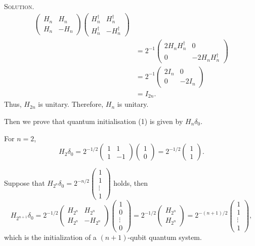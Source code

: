 \documentclass{article}[12pt, a4paper]
\newenvironment{solution}{\par\noindent\textsc{Solution. }}{\\\\\par}
\begin{document}
\begin{solution}
$$\begin{aligned}
\begin{pmatrix}
            H_n & H_n \\
            H_n & -H_n
        \end{pmatrix} \begin{pmatrix}
            H_n^{\dagger} & H_n^{\dagger} \\
            H_n^{\dagger} & -H_n^{\dagger}
        \end{pmatrix} \\
        &= 2^{-1}\begin{pmatrix}
            2H_n H_n^{\dagger} & 0 \\
            0 & -2H_n H_n^{\dagger}
        \end{pmatrix} \\
        &= 2^{-1}\begin{pmatrix}
            2I_n & 0 \\
            0 & -2I_n
        \end{pmatrix} \\
        &= I_{2n}.
    \end{aligned}
    $$
    Thus, \( H_{2n} \) is unitary.
    Therefore, \( H_n \) is unitary.

    Then we prove that quantum initialisation (1) is given by \( H_n \delta_0 \).
    
    For \( n = 2 \),
    \[
    H_2 \delta_0 = 2^{-1/2} \begin{pmatrix} 1 & 1 \\ 1 & -1 \end{pmatrix} \begin{pmatrix} 1 \\ 0  \end{pmatrix} = 2^{-1/2} \begin{pmatrix} 1 \\ 1 \end{pmatrix}.
    \]

    Suppose that $H_{2^n} \delta_0 = 2^{-n/2} \begin{pmatrix} 1 \\ 1 \\ \vdots \\ 1 \end{pmatrix}$ holds, then
    \[
    H_{2^{n+1}} \delta_0 = 2^{-1/2} \begin{pmatrix}
        H_{2^n} & H_{2^n} \\
        H_{2^n} & -H_{2^n}
    \end{pmatrix} \begin{pmatrix} 1 \\ 0 \\ \vdots \\ 0 \end{pmatrix} = 2^{-1/2} \begin{pmatrix} H_{2^n} \\ H_{2^n} \end{pmatrix} = 2^{-(n+1)/2} \begin{pmatrix} 1 \\ 1 \\ \vdots \\ 1 \end{pmatrix},
    \]
    which is the initialization of a $(n+1)$-qubit quantum system.


\end{solution}
\end{document}

